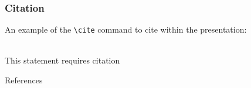 \documentclass[aspectratio=169,xcolor=dvipsnames, t]{beamer}
\begin{document}
    \begin{frame}[fragile] %
        \frametitle{Citation}
        An example of the \verb|\cite| command to cite within the presentation:\\~
                
        This statement requires citation \cite{ahmed2013distributed}
    \end{frame}

    \begin{frame}[allowframebreaks]{References}
        \footnotesize
        \renewcommand{\bibsection}{}
        
    \end{frame}

    \makefinalpage
\end{document}
